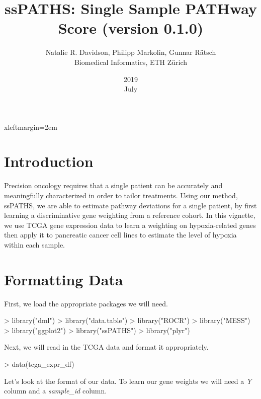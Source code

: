\documentclass{article}
\title{ssPATHS: Single Sample  PATHway Score (version 0.1.0)}
\date{2019\\ July}
\author{Natalie R. Davidson, Philipp Markolin, Gunnar R{\"a}tsch
        \\ Biomedical Informatics, ETH Z{\"u}rich}
\begin{document}
\maketitle





 {xleftmargin=2em}
\renewenvironment{Schunk}{\vspace{\topsep}}{\vspace{\topsep}}


\section{Introduction}

Precision oncology requires that a single patient can be accurately and
meaningfully characterized in order to tailor treatments.
Using our method, ssPATHS, we are able to estimate pathway
deviations for a single patient, by first learning a discriminative gene
weighting from a reference cohort. In this vignette, we use TCGA gene expression
data to learn a weighting on hypoxia-related genes then apply it to pancreatic
cancer cell lines to estimate the level of hypoxia within each sample.

\section{Formatting Data}

First, we load the appropriate packages we will need.
\begin{Schunk}
\begin{Sinput}
> library("dml")
> library("data.table")
> library("ROCR")
> library("MESS")
> library("ggplot2")
> library("ssPATHS")
> library("plyr")
\end{Sinput}
\end{Schunk}

Next, we will read in the TCGA data and format it appropriately.
\begin{Schunk}
\begin{Sinput}
> data(tcga_expr_df)
\end{Sinput}
\end{Schunk}

Let's look at the format of our data. To learn our gene weights we will need a
\emph{Y} column and a \emph{sample\_id} column.
\end{document}
